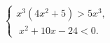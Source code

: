 \begin{ex}[type=ineq_system]
	\begin{condition}
		$\begin{cases} x^3(4x^2  + 5)>5x^3 ,\\
			\; x^2 + 10x - 24<0 .
		\end{cases}$
	\end{condition}
\end{ex}